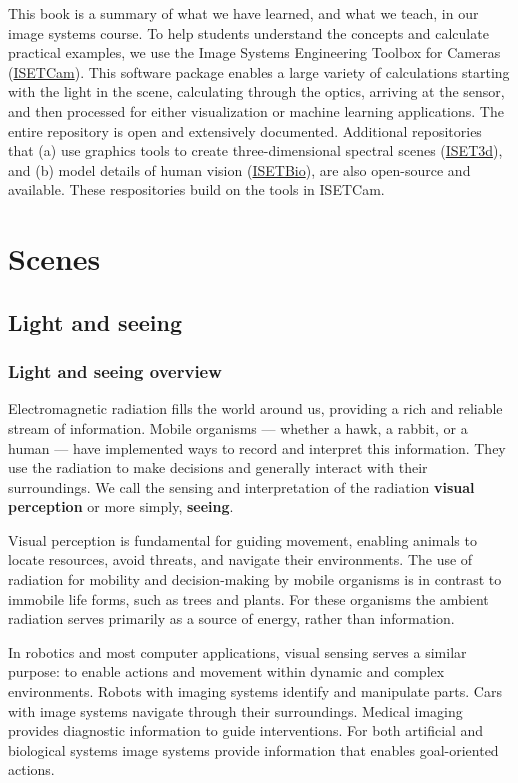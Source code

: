 \documentclass[
  letterpaper,
]{book}
\begin{document}
This book is a summary of what we have learned, and what we teach, in
our image systems course. To help students understand the concepts and
calculate practical examples, we use the Image Systems Engineering
Toolbox for Cameras
(\href{https://github.com/iset/isetcam/wiki}{ISETCam}). This software
package enables a large variety of calculations starting with the light
in the scene, calculating through the optics, arriving at the sensor,
and then processed for either visualization or machine learning
applications. The entire repository is open and extensively documented.
Additional repositories that (a) use graphics tools to create
three-dimensional spectral scenes
(\href{https://github.com/iset/iset3d-tiny/wiki}{ISET3d}), and (b) model
details of human vision
(\href{https://github.com/isetbio/isetbio/wiki}{ISETBio}), are also
open-source and available. These respositories build on the tools in
ISETCam.

\part{Scenes}

\chapter{Light and seeing}\label{sec-light}

\section{Light and seeing overview}\label{sec-light-overview}

Electromagnetic radiation fills the world around us, providing a rich
and reliable stream of information. Mobile organisms --- whether a hawk,
a rabbit, or a human --- have implemented ways to record and interpret
this information. They use the radiation to make decisions and generally
interact with their surroundings. We call the sensing and interpretation
of the radiation \textbf{visual perception} or more simply,
\textbf{seeing}.

Visual perception is fundamental for guiding movement, enabling animals
to locate resources, avoid threats, and navigate their environments. The
use of radiation for mobility and decision-making by mobile organisms is
in contrast to immobile life forms, such as trees and plants. For these
organisms the ambient radiation serves primarily as a source of energy,
rather than information.

In robotics and most computer applications, visual sensing serves a
similar purpose: to enable actions and movement within dynamic and
complex environments. Robots with imaging systems identify and
manipulate parts. Cars with image systems navigate through their
surroundings. Medical imaging provides diagnostic information to guide
interventions. For both artificial and biological systems image systems
provide information that enables goal-oriented actions.
\end{document}
